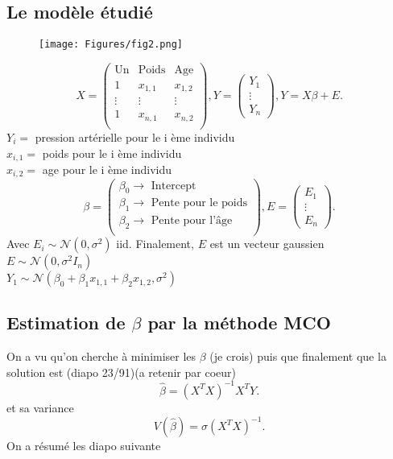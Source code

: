\documentclass{article}
\theoremstyle{plain}%
\theoremstyle{definition}
\theoremstyle{remark}
\begin{document}
\subsection{Le modèle étudié}
\begin{figure}[htbp]
    \centering
    \texttt{[image: Figures/fig2.png]}
\end{figure}


\[
    X = \begin{pmatrix}
        \text{Un} & \text{Poids} & \text{Age} \\
        1 & x_{1,1} & x_{1,2} \\
        \vdots  & \vdots  & \vdots  \\
        1 & x_{n,1} & x_{n,2} \\
    \end{pmatrix} , Y = \begin{pmatrix}
        Y_1 \\
        \vdots  \\
        Y_n
    \end{pmatrix}, Y = X \beta + E 
.\]
$ Y_i = $  pression artérielle pour le i ème individu \\
$ x_{i,1} = $  poids pour le i ème individu \\
$ x_{i,2} = $  age pour le i ème individu
\[
    \beta  = \begin{pmatrix}
        \beta _0 \rightarrow \text{ Intercept} \\
        \beta _1 \rightarrow \text{ Pente pour le poids} \\
        \beta _2 \rightarrow \text{ Pente pour l'âge} \\
    \end{pmatrix}, E = \begin{pmatrix}
        E_1 \\
        \vdots \\
        E_n
    \end{pmatrix}
.\]
Avec $ E_i \sim \mathcal{N}(0, \sigma ^2) $ iid. Finalement, $ E $  est un vecteur gaussien $ E \sim \mathcal{N}(0, \sigma ^2 I_n) $ \\
$ Y_1 \sim \mathcal{N}(\beta _0+ \beta _1 x_{1,1} + \beta _2 x_{1,2}, \sigma ^2 ) $ 

\subsection{Estimation de $ \beta  $ par la méthode MCO}
On a vu qu'on cherche à minimiser les $ \beta  $ (je crois) puis que finalement que la solution est (diapo 23/91)(a retenir par coeur)
\[
    \hat{\beta } = (X^T X )^{-1} X^T Y
.\]
et sa variance 
\[
    V(\hat{\beta }) = \sigma (X^TX)^{-1}
.\]
On a résumé les diapo suivante 
\end{document}
